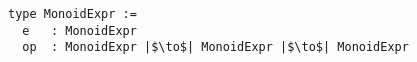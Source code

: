 \begin{verbatim}  
type MonoidExpr := 
  e   : MonoidExpr 
  op  : MonoidExpr |$\to$| MonoidExpr |$\to$| MonoidExpr
\end{verbatim}            